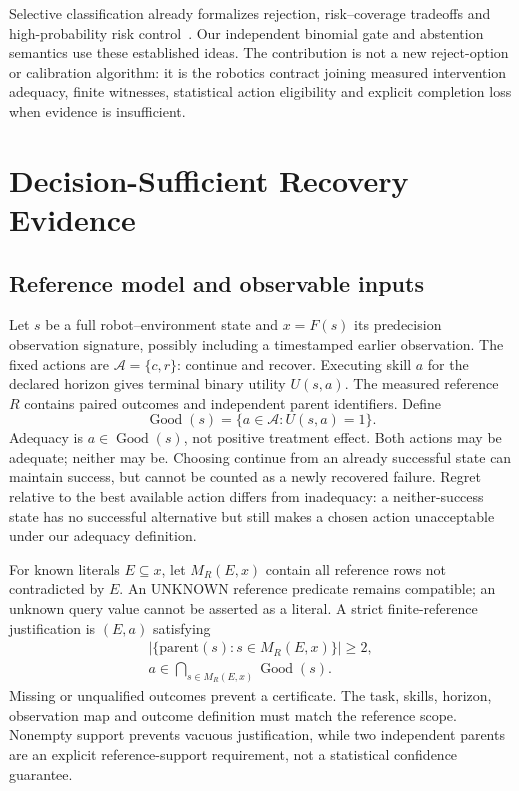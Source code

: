 \documentclass[conference]{IEEEtran}
\newcommand{\Good}{\operatorname{Good}}
\begin{document}
Selective classification already formalizes rejection, risk--coverage tradeoffs and high-probability risk control~\cite{selective2017}. Our independent binomial gate and abstention semantics use these established ideas. The contribution is not a new reject-option or calibration algorithm: it is the robotics contract joining measured intervention adequacy, finite witnesses, statistical action eligibility and explicit completion loss when evidence is insufficient.

\section{Decision-Sufficient Recovery Evidence}
\subsection{Reference model and observable inputs}
Let $s$ be a full robot--environment state and $x=F(s)$ its predecision observation signature, possibly including a timestamped earlier observation. The fixed actions are $\mathcal A=\{c,r\}$: continue and recover. Executing skill $a$ for the declared horizon gives terminal binary utility $U(s,a)$. The measured reference $R$ contains paired outcomes and independent parent identifiers. Define
\begin{equation}
\Good(s)=\{a\in\mathcal A:U(s,a)=1\}.
\end{equation}
Adequacy is $a\in\Good(s)$, not positive treatment effect. Both actions may be adequate; neither may be. Choosing continue from an already successful state can maintain success, but cannot be counted as a newly recovered failure. Regret relative to the best available action differs from inadequacy: a neither-success state has no successful alternative but still makes a chosen action unacceptable under our adequacy definition.

For known literals $E\subseteq x$, let $M_R(E,x)$ contain all reference rows not contradicted by $E$. An UNKNOWN reference predicate remains compatible; an unknown query value cannot be asserted as a literal. A strict finite-reference justification is $(E,a)$ satisfying
\begin{equation}
\begin{gathered}
|\{\text{parent}(s):s\in M_R(E,x)\}|\ge 2,\\
a\in\bigcap_{s\in M_R(E,x)}\Good(s).
\end{gathered}
\label{eq:strict}
\end{equation}
Missing or unqualified outcomes prevent a certificate. The task, skills, horizon, observation map and outcome definition must match the reference scope. Nonempty support prevents vacuous justification, while two independent parents are an explicit reference-support requirement, not a statistical confidence guarantee.
\end{document}
